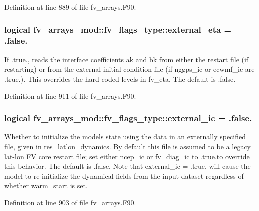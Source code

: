 Definition at line 889 of file fv\-\_\-arrays.\-F90.

\subsubsection[{external\-\_\-eta}]{\setlength{\rightskip}{0pt plus 5cm}logical fv\-\_\-arrays\-\_\-mod\-::fv\-\_\-flags\-\_\-type\-::external\-\_\-eta = .false.}\label{structfv__arrays__mod_1_1fv__flags__type_a5b7f59a6a09f6aef71d0c7fe841dfdf7}


If .true., reads the interface coefficients ak and bk from either the restart file (if restarting) or from the external initial condition file (if nggps\-\_\-ic or ecwmf\-\_\-ic are .true.). This overrides the hard-\/coded levels in fv\-\_\-eta. The default is .false. 



Definition at line 911 of file fv\-\_\-arrays.\-F90.

\subsubsection[{external\-\_\-ic}]{\setlength{\rightskip}{0pt plus 5cm}logical fv\-\_\-arrays\-\_\-mod\-::fv\-\_\-flags\-\_\-type\-::external\-\_\-ic = .false.}\label{structfv__arrays__mod_1_1fv__flags__type_a82a8f4d18e0103ee3eb70e6175b6eaa3}


Whether to initialize the models state using the data in an externally specified file, given in res\-\_\-latlon\-\_\-dynamics. By default this file is assumed to be a legacy lat-\/lon F\-V core restart file; set either ncep\-\_\-ic or fv\-\_\-diag\-\_\-ic to .true.\-to override this behavior. The default is .false. Note that external\-\_\-ic = .true. will cause the model to re-\/initialize the dynamical fields from the input dataset regardless of whether warm\-\_\-start is set. 



Definition at line 903 of file fv\-\_\-arrays.\-F90.

